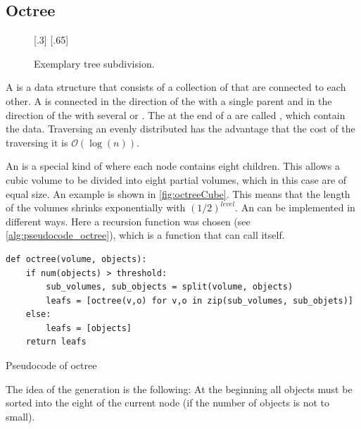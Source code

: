 \subsection{Octree}
%
\begin{figure}[!t]
    \centering
    [.3\textwidth]{
    \def\tikzheight{0.6\textwidth}
    }
    \hfill
    [.65\textwidth]{
    \def\tikzheight{0.6\textwidth}
    }
	\caption{Exemplary tree subdivision.}
	\label{fig:octree}
\end{figure}
%
A  is a data structure that consists of a collection of  that are connected to each other.
A  is connected in the direction of the  with a single parent  and in the direction of the  with several  or .
The  at the end of a  are called , which contain the data.
Traversing an evenly distributed  has the advantage that the cost of the traversing it is $\mathcal{O}(\log(n))$.
\par
%
An  is a special kind of  where each node contains eight children.
This allows a cubic volume to be divided into eight partial volumes, which in this case are of equal size.
An example is shown in \cref{fig:octreeCube}.
This means that the length of the volumes shrinks exponentially with $(1/2)^\mathit{level}$.
An  can be implemented in different ways.
Here a recursion function was chosen (see \cref{alg:pseudocode_octree}), which is a function that can call itself.
%
\begin{lstfloat}[!tb]
\lstset{style=python}
\begin{lstlisting}[]
def octree(volume, objects):
    if num(objects) > threshold:
        sub_volumes, sub_objects = split(volume, objects)
        leafs = [octree(v,o) for v,o in zip(sub_volumes, sub_objets)]
    else:
        leafs = [objects]
    return leafs
\end{lstlisting}
\caption{Pseudocode of octree}
\label{alg:pseudocode_octree}
\end{lstfloat}
%
The idea of the  generation is the following:
At the beginning all objects must be sorted into the eight  of the current node (if the number of objects is not to small).
